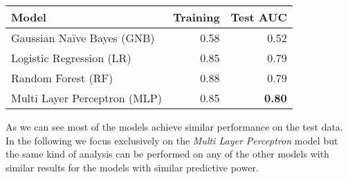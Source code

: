 




\begin{center}
\begin{tabular}{l|rr}
Model & Training & Test AUC \\
\hline
Gaussian Na\"ive Bayes (GNB) \cite{DBLP:conf/flairs/Zhang04} & 0.58 & 0.52 \\
Logistic Regression (LR) \cite{Yu:2011:DCD:2039082.2039098} & 0.85 & 0.79 \\
Random Forest (RF) \cite{Breiman:2001:RF:570181.570182} & 0.88 & 0.79 \\
Multi Layer Perceptron (MLP) \cite{DBLP:journals/corr/HeZR015} & 0.85 & \textbf{0.80} \\
\end{tabular}
\label{tab:auc1}
\end{center}

As we can see most of the models achieve similar performance on the test data. In the following we focus exclusively on the \textit{Multi Layer Perceptron} model but the same kind of analysis can be performed on any of the other models with similar results for the models with similar predictive power.


